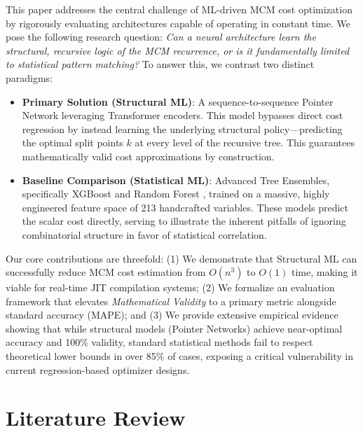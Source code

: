 \documentclass[conference]{IEEEtran}
\begin{document}
This paper addresses the central challenge of ML-driven MCM cost optimization by rigorously evaluating architectures capable of operating in constant time. We pose the following research question: \textit{Can a neural architecture learn the structural, recursive logic of the MCM recurrence, or is it fundamentally limited to statistical pattern matching?}
To answer this, we contrast two distinct paradigms:
\begin{itemize}
    \item \textbf{Primary Solution (Structural ML)}: A sequence-to-sequence Pointer Network \cite{b7} leveraging Transformer encoders. This model bypasses direct cost regression by instead learning the underlying structural policy—predicting the optimal split points $k$ at every level of the recursive tree. This guarantees mathematically valid cost approximations by construction.
    \item \textbf{Baseline Comparison (Statistical ML)}: Advanced Tree Ensembles, specifically XGBoost \cite{b12} and Random Forest \cite{b13}, trained on a massive, highly engineered feature space of 213 handcrafted variables. These models predict the scalar cost directly, serving to illustrate the inherent pitfalls of ignoring combinatorial structure in favor of statistical correlation.
\end{itemize}

Our core contributions are threefold: (1) We demonstrate that Structural ML can successfully reduce MCM cost estimation from $O(n^3)$ to $O(1)$ time, making it viable for real-time JIT compilation systems; (2) We formalize an evaluation framework that elevates \textit{Mathematical Validity} to a primary metric alongside standard accuracy (MAPE); and (3) We provide extensive empirical evidence showing that while structural models (Pointer Networks) achieve near-optimal accuracy and 100\% validity, standard statistical methods fail to respect theoretical lower bounds in over 85\% of cases, exposing a critical vulnerability in current regression-based optimizer designs.

\section{Literature Review}
\end{document}

